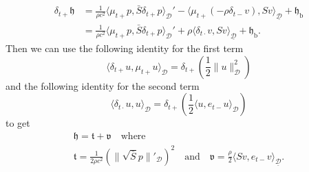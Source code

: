 \documentclass[dvipsnames]{article}
\begin{document}
\begin{align}
    \delta_{t+}\mathfrak{h} &= \frac{1}{\rho c^2}\langle \mu_{t+}p, \bar S \delta_{t+}p \rangle_{\mathcal{D}}' -\langle \mu_{t+}(-\rho\delta_{t-}v), Sv\rangle_{\underline{\mathcal{D}}} + \mathfrak{h}_\text{b}\\
    &= \frac{1}{\rho c^2}\langle \mu_{t+}p, \bar S \delta_{t+}p \rangle_{\mathcal{D}}' + \rho \langle \delta_{t\cdot}v, Sv\rangle_{\underline{\mathcal{D}}} + \mathfrak{h}_\text{b}.
\end{align}
Then we can use the following identity for the first term
\begin{equation}
    \langle\delta_{t+}u, \mu_{t+}u\rangle_\mathcal{D} = \delta_{t+}\left(\frac{1}{2}\lVert u\rVert^2_\mathcal{D}\right)
\end{equation}
and the following identity for the second term
\begin{equation}
    \langle\delta_{t\cdot}u, u\rangle_\mathcal{D} = \delta_{t+}\left(\frac{1}{2}\langle u,e_{t-}u\rangle_\mathcal{D}\right)
\end{equation}
to get
\begin{equation}
    \begin{gathered}
        \mathfrak{h} = \mathfrak{t} + \mathfrak{v}\quad \text{where}\\
       \mathfrak{t} = \frac{1}{2\rho c^2}\left(\lVert\sqrt{\bar S }p\rVert'_\mathcal{D}\right)^2\quad \text{and} \quad \mathfrak{v} = \frac{\rho}{2}\langle Sv, e_{t-}v\rangle_{\underline{\mathcal{D}}}.
    \end{gathered}
\end{equation}
\end{document}
